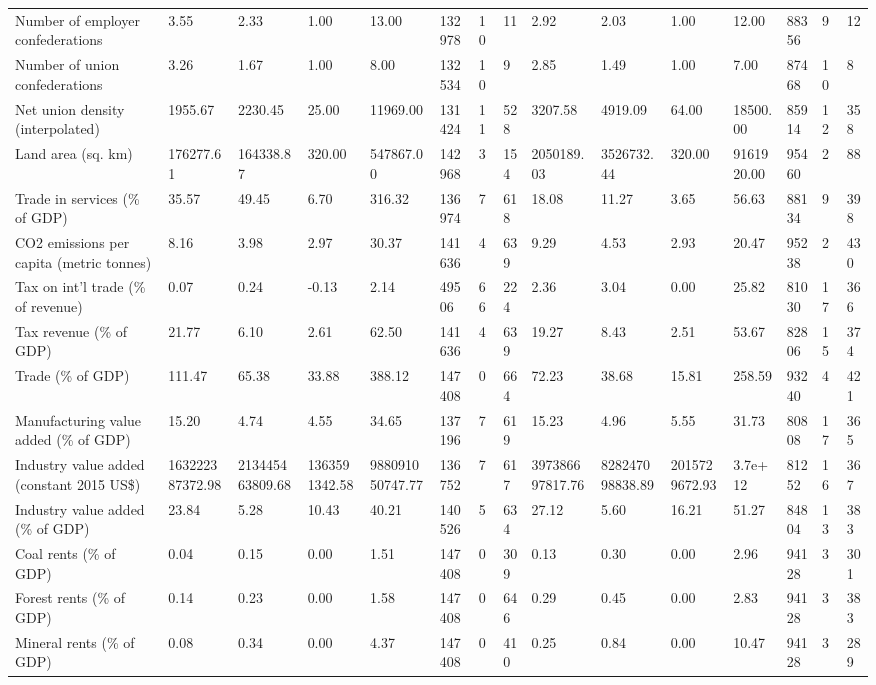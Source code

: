 \begin{longtable}{lllllllllllllll}
\addlinespace
Number of employer confederations & 3.55 & 2.33 & 1.00 & 13.00 & 132978 & 10 & 11 & 2.92 & 2.03 & 1.00 & 12.00 & 88356 & 9 & 12\\
Number of union confederations & 3.26 & 1.67 & 1.00 & 8.00 & 132534 & 10 & 9 & 2.85 & 1.49 & 1.00 & 7.00 & 87468 & 10 & 8\\
Net union density (interpolated) & 1955.67 & 2230.45 & 25.00 & 11969.00 & 131424 & 11 & 528 & 3207.58 & 4919.09 & 64.00 & 18500.00 & 85914 & 12 & 358\\
Land area (sq. km) & 176277.61 & 164338.87 & 320.00 & 547867.00 & 142968 & 3 & 154 & 2050189.03 & 3526732.44 & 320.00 & 9161920.00 & 95460 & 2 & 88\\
Trade in services (\% of GDP) & 35.57 & 49.45 & 6.70 & 316.32 & 136974 & 7 & 618 & 18.08 & 11.27 & 3.65 & 56.63 & 88134 & 9 & 398\\
\addlinespace
CO2 emissions per capita (metric tonnes) & 8.16 & 3.98 & 2.97 & 30.37 & 141636 & 4 & 639 & 9.29 & 4.53 & 2.93 & 20.47 & 95238 & 2 & 430\\
Tax on int'l trade (\% of revenue) & 0.07 & 0.24 & -0.13 & 2.14 & 49506 & 66 & 224 & 2.36 & 3.04 & 0.00 & 25.82 & 81030 & 17 & 366\\
Tax revenue (\% of GDP) & 21.77 & 6.10 & 2.61 & 62.50 & 141636 & 4 & 639 & 19.27 & 8.43 & 2.51 & 53.67 & 82806 & 15 & 374\\
Trade (\% of GDP) & 111.47 & 65.38 & 33.88 & 388.12 & 147408 & 0 & 664 & 72.23 & 38.68 & 15.81 & 258.59 & 93240 & 4 & 421\\
Manufacturing value added (\% of GDP) & 15.20 & 4.74 & 4.55 & 34.65 & 137196 & 7 & 619 & 15.23 & 4.96 & 5.55 & 31.73 & 80808 & 17 & 365\\
\addlinespace
Industry value added (constant 2015 US\$) & 163222387372.98 & 213445463809.68 & 1363591342.58 & 988091050747.77 & 136752 & 7 & 617 & 397386697817.76 & 828247098838.89 & 2015729672.93 & 3.7e+12 & 81252 & 16 & 367\\
Industry value added (\% of GDP) & 23.84 & 5.28 & 10.43 & 40.21 & 140526 & 5 & 634 & 27.12 & 5.60 & 16.21 & 51.27 & 84804 & 13 & 383\\
Coal rents (\% of GDP) & 0.04 & 0.15 & 0.00 & 1.51 & 147408 & 0 & 309 & 0.13 & 0.30 & 0.00 & 2.96 & 94128 & 3 & 301\\
Forest rents (\% of GDP) & 0.14 & 0.23 & 0.00 & 1.58 & 147408 & 0 & 646 & 0.29 & 0.45 & 0.00 & 2.83 & 94128 & 3 & 383\\
Mineral rents (\% of GDP) & 0.08 & 0.34 & 0.00 & 4.37 & 147408 & 0 & 410 & 0.25 & 0.84 & 0.00 & 10.47 & 94128 & 3 & 289\\

\end{longtable}
